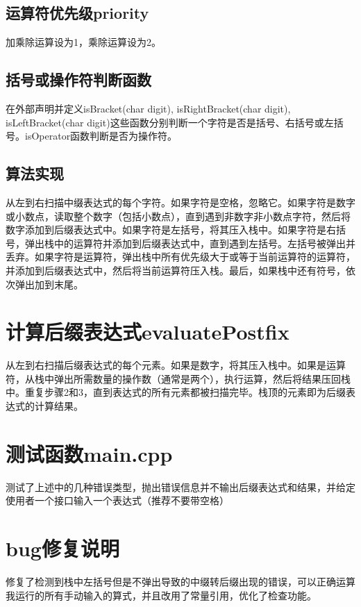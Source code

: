 \documentclass{article}
\begin{document}
\subsection{运算符优先级priority}加乘除运算设为1，乘除运算设为2。

\subsection{括号或操作符判断函数}在外部声明并定义isBracket(char digit), isRightBracket(char digit), isLeftBracket(char digit)这些函数分别判断一个字符是否是括号、右括号或左括号。isOperator函数判断是否为操作符。

\subsection{算法实现}从左到右扫描中缀表达式的每个字符。如果字符是空格，忽略它。如果字符是数字或小数点，读取整个数字（包括小数点），直到遇到非数字非小数点字符，然后将数字添加到后缀表达式中。如果字符是左括号，将其压入栈中。如果字符是右括号，弹出栈中的运算符并添加到后缀表达式中，直到遇到左括号。左括号被弹出并丢弃。如果字符是运算符，弹出栈中所有优先级大于或等于当前运算符的运算符，并添加到后缀表达式中，然后将当前运算符压入栈。最后，如果栈中还有符号，依次弹出加到末尾。

\section{计算后缀表达式evaluatePostfix}
从左到右扫描后缀表达式的每个元素。如果是数字，将其压入栈中。如果是运算符，从栈中弹出所需数量的操作数（通常是两个），执行运算，然后将结果压回栈中。重复步骤2和3，直到表达式的所有元素都被扫描完毕。栈顶的元素即为后缀表达式的计算结果。

\section{测试函数main.cpp}

测试了上述中的几种错误类型，抛出错误信息并不输出后缀表达式和结果，并给定使用者一个接口输入一个表达式（推荐不要带空格）

\section{bug修复说明}

修复了检测到栈中左括号但是不弹出导致的中缀转后缀出现的错误，可以正确运算我运行的所有手动输入的算式，并且改用了常量引用，优化了检查功能。
\end{document}
